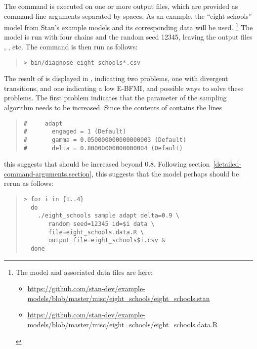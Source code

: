 The  command is executed on one or more output files,
which are provided as command-line arguments separated by spaces. As
an example, the ``eight schools'' model from Stan's example models and
its corresponding data will be used.%
%
\footnote{The model and associated data files are here:
  \begin{itemize}
  \item
    \url{https://github.com/stan-dev/example-models/blob/master/misc/eight_schools/eight_schools.stan}
  \item
    \url{https://github.com/stan-dev/example-models/blob/master/misc/eight_schools/eight_schools.data.R}
  \end{itemize}
}
The model is run with four chains and the random seed 12345, leaving
the output files , ,
etc. The  command is then run as follows:
\begin{quote}
\begin{Verbatim}[fontshape=sl]
> bin/diagnose eight_schools*.csv
\end{Verbatim}
\end{quote}
The result of  is displayed in
, indicating two problems, one with
divergent transitions, and one indicating a low E-BFMI, and possible
ways to solve these problems. The first problem indicates that the
parameter  of the sampling algorithm needs to be
increased. Since the contents of  contains
the lines
\begin{quote}
\begin{Verbatim}
#     adapt
#       engaged = 1 (Default)
#       gamma = 0.050000000000000003 (Default)
#       delta = 0.80000000000000004 (Default)
\end{Verbatim}
\end{quote}
this suggests that  should be increased beyond
0.8. Following section~\ref{detailed-command-arguments.section}, this
suggests that the model perhaps should be rerun as follows:
\begin{quote}
\begin{Verbatim}[fontshape=sl]
> for i in {1..4}
  do
    ./eight_schools sample adapt delta=0.9 \
       random seed=12345 id=$i data \
       file=eight_schools.data.R \
       output file=eight_schools$i.csv &
  done
\end{Verbatim}
\end{quote}

